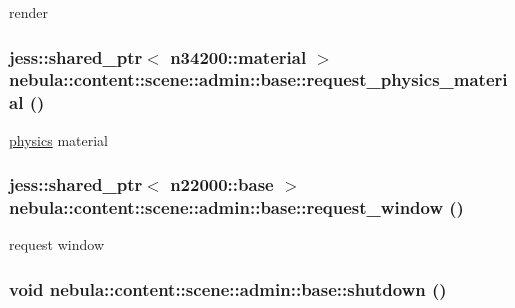 render \hypertarget{classnebula_1_1content_1_1scene_1_1admin_1_1base_a48f3df157de95521f0a0045a3b995c7c}{
\subsubsection[{request\_\-physics\_\-material}]{\setlength{\rightskip}{0pt plus 5cm}jess::shared\_\-ptr$<$ {\bf n34200::material} $>$ nebula::content::scene::admin::base::request\_\-physics\_\-material ()}}
\label{classnebula_1_1content_1_1scene_1_1admin_1_1base_a48f3df157de95521f0a0045a3b995c7c}


\hyperlink{namespacenebula_1_1content_1_1scene_1_1physics}{physics} material \hypertarget{classnebula_1_1content_1_1scene_1_1admin_1_1base_acc441d15af4759faa85966795fe53df8}{
\subsubsection[{request\_\-window}]{\setlength{\rightskip}{0pt plus 5cm}jess::shared\_\-ptr$<$ {\bf n22000::base} $>$ nebula::content::scene::admin::base::request\_\-window ()}}
\label{classnebula_1_1content_1_1scene_1_1admin_1_1base_acc441d15af4759faa85966795fe53df8}


request window \hypertarget{classnebula_1_1content_1_1scene_1_1admin_1_1base_a7c04c9e9d4790b004b68687468956173}{
\subsubsection[{shutdown}]{\setlength{\rightskip}{0pt plus 5cm}void nebula::content::scene::admin::base::shutdown ()}}
\label{classnebula_1_1content_1_1scene_1_1admin_1_1base_a7c04c9e9d4790b004b68687468956173}


